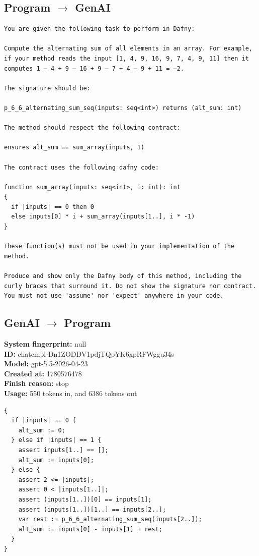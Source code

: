 \documentclass{article}
\begin{document}
\subsection*{Program $\rightarrow$ GenAI}
\begin{lstlisting}
You are given the following task to perform in Dafny:

Compute the alternating sum of all elements in an array. For example, if your method reads the input [1, 4, 9, 16, 9, 7, 4, 9, 11] then it computes 1 – 4 + 9 – 16 + 9 – 7 + 4 – 9 + 11 = –2.

The signature should be:

p_6_6_alternating_sum_seq(inputs: seq<int>) returns (alt_sum: int)

The method should respect the following contract:

ensures alt_sum == sum_array(inputs, 1)

The contract uses the following dafny code:

function sum_array(inputs: seq<int>, i: int): int
{
  if |inputs| == 0 then 0
  else inputs[0] * i + sum_array(inputs[1..], i * -1)
}

These function(s) must not be used in your implementation of the method.

Produce and show only the Dafny body of this method, including the curly braces that surround it. Do not show the signature nor contract. You must not use 'assume' nor 'expect' anywhere in your code.
\end{lstlisting}
\subsection*{GenAI $\rightarrow$ Program}
\textbf{System fingerprint: }null
\\\textbf{ID: }chatcmpl-Dn1ZODDV1pdjTQpYK6xpRFWggu34s
\\\textbf{Model: }gpt-5.5-2026-04-23
\\\textbf{Created at: }1780576478
\\\textbf{Finish reason: }stop
\\\textbf{Usage: }550 tokens in, and 6386 tokens out
\begin{lstlisting}
{
  if |inputs| == 0 {
    alt_sum := 0;
  } else if |inputs| == 1 {
    assert inputs[1..] == [];
    alt_sum := inputs[0];
  } else {
    assert 2 <= |inputs|;
    assert 0 < |inputs[1..]|;
    assert (inputs[1..])[0] == inputs[1];
    assert (inputs[1..])[1..] == inputs[2..];
    var rest := p_6_6_alternating_sum_seq(inputs[2..]);
    alt_sum := inputs[0] - inputs[1] + rest;
  }
}
\end{lstlisting}
\end{document}
